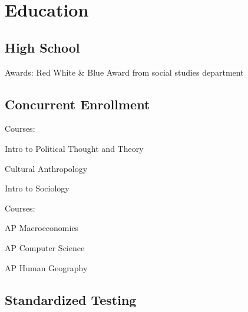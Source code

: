 \documentclass[letterpaper]{resume-shreeram}
\author{Shreeram Modi}
\begin{document}
\maketitle

\section{Education}

\subsection{High School}

\begin{compactitem}
  \item Awards: Red White \& Blue Award from social studies department
\end{compactitem}

\subsection{Concurrent Enrollment}

\begin{compactitem}
  \item Courses:
  \begin{compactitem}
    \item Intro to Political Thought and Theory
    \item Cultural Anthropology
    \item Intro to Sociology
  \end{compactitem}
\end{compactitem}

\begin{compactitem}
  \item Courses:
  \begin{compactitem}
    \item AP Macroeconomics
    \item AP Computer Science
    \item AP Human Geography
  \end{compactitem}
\end{compactitem}

\subsection{Standardized Testing}
\end{document}
